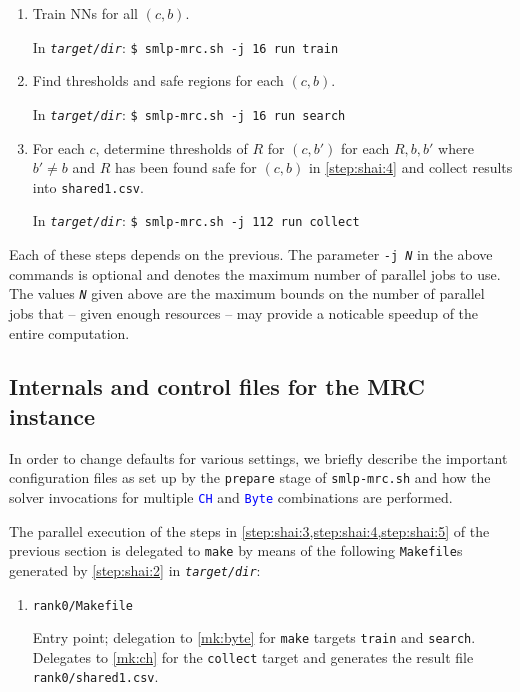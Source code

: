 \documentclass[a4paper,parskip=half]{article} %
\newcommand*\cmdstyle\texttt
\newcommand*\file\cmdstyle
\newcommand*\literalColor{blue}
\newcommand*\cmd[1]{\cmdstyle{\textcolor{red!85!black}{#1}}}
\newcommand*\cmdline[1]{\cmdstyle{\textcolor{green!70!black}\$ }\cmd{#1}}
\newcommand*\literal[1]{\textcolor{\literalColor}{\cmdstyle{#1}}}
\newcommand*\progmrc{smlp-mrc.sh}
\begin{document}
{\begin{enumerate}
	\cmdline{\progmrc{} -i \emph{data.csv} -s \emph{data.spec}
		-t \emph{target/dir}
		run prepare}

	resulting in a directory tree at \emph{\file{target/dir}} prepared for
	the following steps.
\item\label{step:shai:3}
	Train NNs for all $(c,b)$.

	In \file{\emph{target/dir}}: \cmdline{\progmrc{} -j 16 run train}
\item\label{step:shai:4}
	Find thresholds and safe regions for each $(c,b)$.

	In \file{\emph{target/dir}}: \cmdline{\progmrc{} -j 16 run search}
\item\label{step:shai:5}
	For each $c$, determine thresholds of $R$ for $(c,b')$
	for each $R,b,b'$ where $b'\neq b$ and $R$ has been found safe for
	$(c,b)$ in \cref{step:shai:4} and
	collect results into \file{shared1.csv}.

	In \file{\emph{target/dir}}: \cmdline{\progmrc{} -j 112 run collect}
\end{enumerate}
Each of these steps depends on the previous.
The parameter \cmdstyle{-j \emph N} in the above commands is optional and
denotes the maximum number of parallel jobs to use. The values \cmdstyle{\emph N}
given above are the maximum bounds on the number of parallel jobs that
-- given enough resources -- may provide a noticable speedup of the entire
computation.


\subsection{Internals and control files for the MRC instance}
In order to change defaults for various settings, we briefly describe the
important configuration files as set up by the \cmdstyle{prepare} stage of
\cmd{\progmrc} and how the solver invocations for multiple \literal{CH} and
\literal{Byte} combinations are performed.

The parallel execution of the steps in
\cref{step:shai:3,step:shai:4,step:shai:5} of the previous section
is delegated to \cmd{make} by means of the
following \file{Makefile}s generated by \cref{step:shai:2} in
\emph{\file{target/dir}}:
\begin{enumerate}
\item\label{mk:rank} \file{rank0/Makefile}

	Entry point; delegation to \cref{mk:byte} for \cmd{make} targets
	\cmdstyle{train} and \cmdstyle{search}.
	Delegates to \cref{mk:ch} for the \cmdstyle{collect} target and
	generates the result file \file{rank0/shared1.csv}.


\end{enumerate}}
\end{document}

